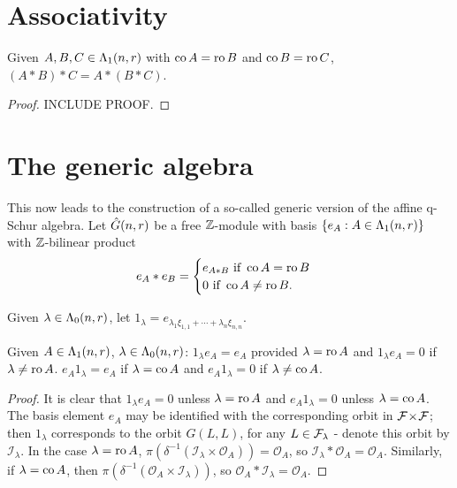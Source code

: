 \documentclass[a4paper, 11pt]{report}
\begin{document}
\section{Associativity}

\begin{proposition}\label{proposition:associativity-maximum}
Given $A,B,C\in\Lambda_1(n,r)$ with $\operatorname{co}{A}=\operatorname{ro}{B}$ and $\operatorname{co}{B}=\operatorname{ro}{C}$, $(A\ast B)\ast C = A\ast (B\ast C)$.
\end{proposition}
\begin{proof}
INCLUDE PROOF.
\end{proof}

\section{The generic algebra}

This now leads to the construction of a so-called generic version of the affine q-Schur algebra. Let $\hat{G}(n,r)$ be a free $\mathbb{Z}$-module with basis $\{e_A:A\in\Lambda_1(n,r)\}$ with $\mathbb{Z}$-bilinear product
\begin{equation*}
e_A\ast e_B = \begin{cases}
e_{A\ast B} \text{ if } \operatorname{co}{A}=\operatorname{ro}{B}\\
0 \text{ if } \operatorname{co}{A}\neq \operatorname{ro}{B}.
\end{cases}
\end{equation*}

Given $\lambda\in\Lambda_0(n,r)$, let $1_\lambda = e_{\lambda_1\xi_{1,1} + \cdots + \lambda_n\xi_{n,n}}$.

\begin{lemma}\label{lemma:one-sided-identity}
Given $A\in\Lambda_1(n,r)$, $\lambda\in\Lambda_0(n,r)$: $1_\lambda e_A = e_A$ provided  $\lambda = \operatorname{ro}{A}$ and $1_\lambda e_A = 0$ if $\lambda\neq \operatorname{ro}{A}$. $e_A1_\lambda = e_A$ if $\lambda = \operatorname{co}{A}$ and $e_A 1_\lambda = 0$ if $\lambda \neq \operatorname{co}{A}$.
\end{lemma}
\begin{proof}
It is clear that $1_\lambda e_A=0$ unless $\lambda = \operatorname{ro}{A}$ and $e_A 1_\lambda = 0$ unless $\lambda = \operatorname{co}{A}$. The basis element $e_A$ may be identified with the corresponding orbit in ${\mathcal{F}\!\times\!\mathcal{F}}$; then $1_{\lambda}$ corresponds to the orbit $G(L,L)$, for any $L\in\mathcal{F}_\lambda$ - denote this orbit by $\mathcal{I}_\lambda$. In the case $\lambda = \operatorname{ro}{A}$, $\pi(\delta^{-1}(\mathcal{I}_\lambda\times\mathcal{O}_A)) = \mathcal{O}_A$, so $\mathcal{I}_\lambda\ast \mathcal{O}_A = \mathcal{O}_A$. Similarly, if $\lambda = \operatorname{co}{A}$, then $\pi(\delta^{-1}(\mathcal{O}_A\times\mathcal{I}_\lambda))$, so $\mathcal{O}_A\ast \mathcal{I}_\lambda = \mathcal{O}_A$.
\end{proof}
\end{document}
